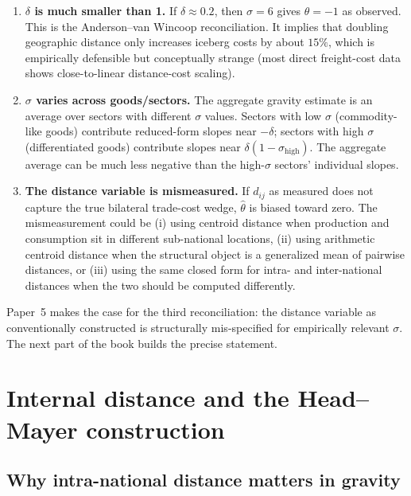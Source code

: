 \documentclass[11pt,letterpaper,oneside]{book}
\theoremstyle{definition}
\theoremstyle{remark}
\begin{document}
\begin{enumerate}
\item \textbf{$\delta$ is much smaller than 1.} If $\delta \approx 0.2$, then $\sigma = 6$ gives $\theta = -1$ as observed. This is the Anderson--van Wincoop reconciliation. It implies that doubling geographic distance only increases iceberg costs by about $15\%$, which is empirically defensible but conceptually strange (most direct freight-cost data shows close-to-linear distance-cost scaling).

\item \textbf{$\sigma$ varies across goods/sectors.} The aggregate gravity estimate is an average over sectors with different $\sigma$ values. Sectors with low $\sigma$ (commodity-like goods) contribute reduced-form slopes near $-\delta$; sectors with high $\sigma$ (differentiated goods) contribute slopes near $\delta(1-\sigma_{\text{high}})$. The aggregate average can be much less negative than the high-$\sigma$ sectors' individual slopes.

\item \textbf{The distance variable is mismeasured.} If $d_{ij}$ as measured does not capture the true bilateral trade-cost wedge, $\hat\theta$ is biased toward zero. The mismeasurement could be (i) using centroid distance when production and consumption sit in different sub-national locations, (ii) using arithmetic centroid distance when the structural object is a generalized mean of pairwise distances, or (iii) using the same closed form for intra- and inter-national distances when the two should be computed differently.
\end{enumerate}

Paper~5 makes the case for the third reconciliation: the distance variable as conventionally constructed is structurally mis-specified for empirically relevant $\sigma$. The next part of the book builds the precise statement.

\part{Internal distance and the Head--Mayer construction}

\chapter{Why intra-national distance matters in gravity}
\end{document}
